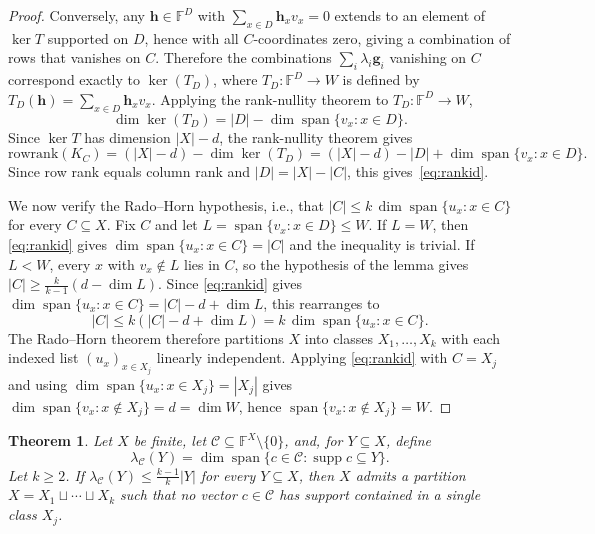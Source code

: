 \documentclass[11pt]{amsart}
\newtheorem{theorem}{Theorem}[section]
\newcommand{\F}{\mathbb{F}}
\DeclareMathOperator{\Span}{span}
\begin{document}
\begin{proof}
Conversely, any $\mathbf{h} \in \F^D$ with $\sum_{x\in D}\mathbf{h}_x v_x = 0$
extends to an element of $\ker T$ supported on $D$, hence with all
$C$-coordinates zero, giving a combination of rows that vanishes on $C$.
Therefore the combinations
$\sum_i\lambda_i\mathbf{g}_i$ vanishing on $C$ correspond exactly to
$\ker(T_D)$, where $T_D : \F^D \to W$ is defined by $T_D(\mathbf{h}) =
\sum_{x\in D}\mathbf{h}_x v_x$. Applying the rank-nullity theorem to $T_D : \F^D \to W$,
$$
        \dim\ker(T_D) = |D| - \dim\Span\{v_x : x\in D\}.
$$
Since $\ker T$ has dimension $|X|-d$, the rank-nullity theorem gives
$$
        \mathrm{rowrank}(K_C)
        = (|X|-d) - \dim\ker(T_D)
        = (|X|-d) - |D| + \dim\Span\{v_x:x\in D\}.
$$
Since row rank equals column rank and $|D| = |X|-|C|$, this gives~\eqref{eq:rankid}.

We now verify the Rado--Horn hypothesis, i.e., that $|C| \leq
k\,\dim\Span\{u_x : x \in C\}$ for every $C \subseteq X$. Fix $C$ and let $L
= \Span\{v_x : x \in D\} \leq W$. If $L = W$, then \eqref{eq:rankid} gives
$\dim\Span\{u_x : x \in C\} = |C|$ and the inequality is trivial. If $L < W$,
every $x$ with $v_x \notin L$ lies in $C$, so the hypothesis of the lemma
gives $|C| \geq \frac{k}{k-1}(d - \dim L)$. Since \eqref{eq:rankid} gives
$\dim\Span\{u_x : x \in C\} = |C| - d + \dim L$, this rearranges to
$$
        |C| \leq k(|C| - d + \dim L) = k\,\dim\Span\{u_x : x \in C\}.
$$
The Rado--Horn theorem therefore partitions $X$ into classes $X_1, \ldots, X_k$ with each
indexed list $(u_x)_{x \in X_j}$ linearly independent. Applying \eqref{eq:rankid}
with $C = X_j$ and using $\dim\Span\{u_x : x \in X_j\} = |X_j|$ gives
$\dim\Span\{v_x : x \notin X_j\} = d = \dim W$, hence
$\Span\{v_x : x \notin X_j\} = W$.
\end{proof}

\begin{theorem}\label{thm:supportpartition}
Let $X$ be finite, let $\mathcal C\subseteq \F^X\setminus\{0\}$, and, for
$Y\subseteq X$, define
$$
        \lambda_{\mathcal C}(Y)
        =
        \dim\Span\{c\in\mathcal C:\operatorname{supp} c\subseteq Y\}.
$$
Let $k\geq 2$. If $\lambda_{\mathcal C}(Y) \leq \frac{k-1}{k}|Y|$ for every
$Y\subseteq X$, then $X$ admits a partition $X=X_1\sqcup\cdots\sqcup X_k$
such that no vector $c\in\mathcal C$ has support contained in a single
class $X_j$.
\end{theorem}
\end{document}
